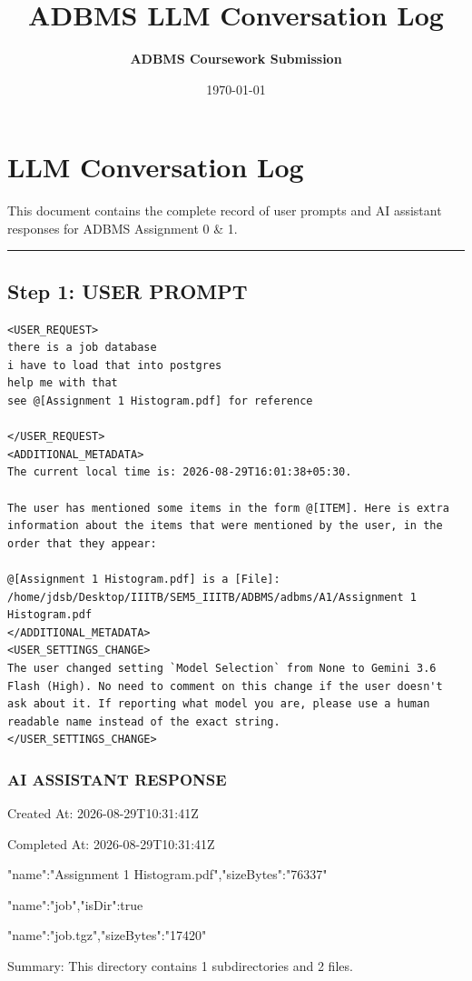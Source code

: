 \documentclass[11pt,a4paper]{article}
\title{\textbf{ADBMS LLM Conversation Log}}
\author{\textbf{ADBMS Coursework Submission}}
\date{\today}
\begin{document}
\maketitle
\tableofcontents
\newpage
\section{LLM Conversation Log}
This document contains the complete record of user prompts and AI assistant responses for ADBMS Assignment 0 \& 1.


\hrule

\subsection{Step 1: USER PROMPT}

\begin{lstlisting}[language=text]
<USER_REQUEST>
there is a job database 
i have to load that into postgres 
help me with that 
see @[Assignment 1 Histogram.pdf] for reference 

</USER_REQUEST>
<ADDITIONAL_METADATA>
The current local time is: 2026-08-29T16:01:38+05:30.

The user has mentioned some items in the form @[ITEM]. Here is extra information about the items that were mentioned by the user, in the order that they appear:

@[Assignment 1 Histogram.pdf] is a [File]:
/home/jdsb/Desktop/IIITB/SEM5_IIITB/ADBMS/adbms/A1/Assignment 1 Histogram.pdf
</ADDITIONAL_METADATA>
<USER_SETTINGS_CHANGE>
The user changed setting `Model Selection` from None to Gemini 3.6 Flash (High). No need to comment on this change if the user doesn't ask about it. If reporting what model you are, please use a human readable name instead of the exact string.
</USER_SETTINGS_CHANGE>
\end{lstlisting}


\subsubsection{AI ASSISTANT RESPONSE}

Created At: 2026-08-29T10:31:41Z

Completed At: 2026-08-29T10:31:41Z

{"name":"Assignment 1 Histogram.pdf","sizeBytes":"76337"}

{"name":"job","isDir":true}

{"name":"job.tgz","sizeBytes":"17420"}


Summary: This directory contains 1 subdirectories and 2 files.
\end{document}
